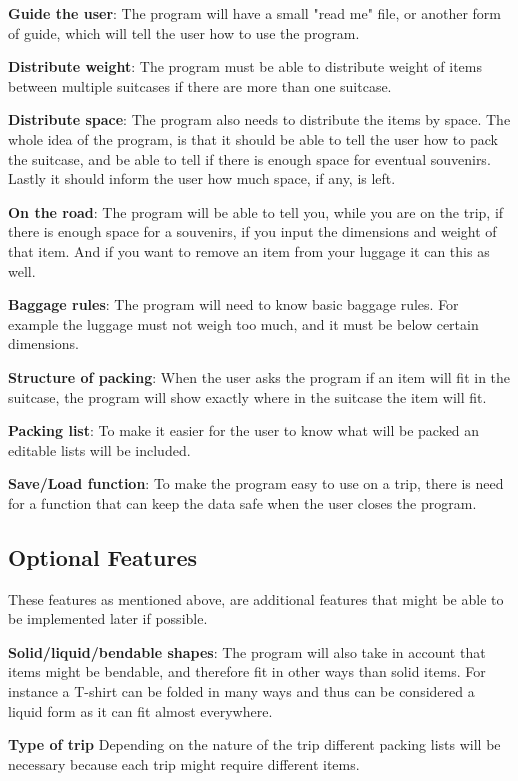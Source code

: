 \textbf{Guide the user}:
The program will have a small "read me" file, or another form of guide, which will tell the user how to use the program.
\newline

\textbf{Distribute weight}:
The program must be able to distribute weight of items between multiple suitcases if there are more than one suitcase.
\newline

\textbf{Distribute space}:
The program also needs to distribute the items by space. The whole idea of the program, is that it should be able to tell the user how to pack the suitcase, and be able to tell if there is enough space for eventual souvenirs. Lastly it should inform the user how much space, if any, is left.
\newline

\textbf{On the road}:
The program will be able to tell you, while you are on the trip, if there is enough space for a souvenirs, if you input the dimensions and weight of that item. And if you want to remove an item from your luggage it can this as well.
\newline

\textbf{Baggage rules}:
The program will need to know basic baggage rules. For example the luggage must not weigh too much, and it must be below certain dimensions.
\newline

\textbf{Structure of packing}:
When the user asks the program if an item will fit in the suitcase, the program will show exactly where in the suitcase the item will fit.
\newline

\textbf{Packing list}:
To make it easier for the user to know what will be packed an editable lists will be included.
\newline

\textbf{Save/Load function}:
To make the program easy to use on a trip, there is need for a function that can keep the data safe when the user closes the program.
\newline

\subsection{Optional Features}
These features as mentioned above, are additional features that might be able to be implemented later if possible.\newline

\textbf{Solid/liquid/bendable shapes}:
The program will also take in account that items might be bendable, and therefore fit in other ways than solid items. For instance a T-shirt can be folded in many ways and thus can be considered a liquid form as it can fit almost everywhere.
\newline

\textbf{Type of trip}
Depending on the nature of the trip different packing lists will be necessary because each trip might require different items.
\newline
